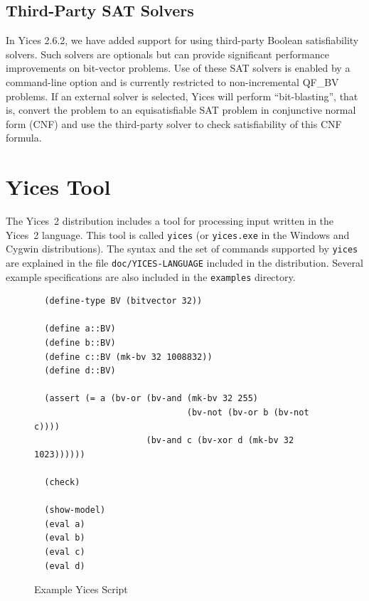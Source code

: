 \documentclass[11pt,twoside,fleqn,openright,titlepage]{cslreport}
\begin{document}
\section{Third-Party SAT Solvers}

In Yices 2.6.2, we have added support for using third-party Boolean
satisfiability solvers. Such solvers are optionals but can provide
significant performance improvements on bit-vector problems. Use of
these SAT solvers is enabled by a command-line option and is currently
restricted to non-incremental QF\_BV problems. If an external solver
is selected, Yices will perform ``bit-blasting'', that is, convert the
problem to an equisatisfiable SAT problem in conjunctive normal form
(CNF) and use the third-party solver to check satisfiability of this
CNF formula.




\chapter{Yices Tool}
\label{yices-shell}

The Yices~2 distribution includes  a tool for processing input written
in  the Yices~2  language.  This  tool is  called  \texttt{yices} (or
\texttt{yices.exe}  in  the Windows  and  Cygwin distributions).   The
syntax  and  the  set  of  commands supported  by  \texttt{yices}  are
explained  in  the file  \texttt{doc/YICES-LANGUAGE}  included in  the
distribution. Several example specifications  are also included in the
\texttt{examples} directory.

\begin{figure}[ht]
\begin{footnotesize}
\begin{verbatim}
  (define-type BV (bitvector 32))

  (define a::BV)
  (define b::BV)
  (define c::BV (mk-bv 32 1008832))
  (define d::BV)

  (assert (= a (bv-or (bv-and (mk-bv 32 255)
                              (bv-not (bv-or b (bv-not c))))
                      (bv-and c (bv-xor d (mk-bv 32 1023))))))

  (check)

  (show-model)
  (eval a)
  (eval b)
  (eval c)
  (eval d)
\end{verbatim}
\end{footnotesize}
\caption{Example Yices Script}
\label{example:bv_test2}
\end{figure}
\end{document}
